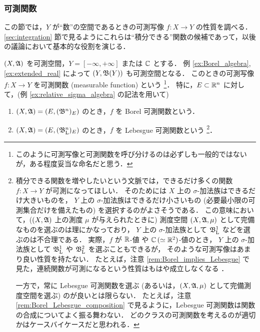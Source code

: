 \subsubsection{可測関数}

この節では，$Y$ が``数''の空間であるときの可測写像 $f:X\to Y$ の性質を調べる．
\ref{sec:integration} 節で見るようにこれらは``積分できる''関数の候補であって，以後の議論において基本的な役割を演じる．

\begin{definition}\label{def:measurable_function}
    $(X,\mathfrak{A})$ を可測空間，$Y=[-\infty,+\infty]$ または $\mathbb{C}$ とする．
    例 \ref{ex:Borel_algebra}, \ref{ex:extended_real} によって $(Y,\mathfrak{B}(Y))$ も可測空間となる．
    このときの可測写像 $f:X\to Y$ を可測関数 (measurable function) という
    \footnote{このように可測写像と可測関数を呼び分けるのは必ずしも一般的ではないが，ある程度妥当な命名だと思う\cite{ms95741}．}．
    特に，$E\subset\mathbb{R}^n$ に対して，(例 \ref{ex:relative_sigma_algebra} の記法を用いて)
    \begin{enumerate}
        \item $(X,\mathfrak{A})=(E,(\mathfrak{B}^n)_E)$ のとき，$f$ を Borel 可測関数という．
        \item $(X,\mathfrak{A})=(E,(\mathfrak{B}_{\mathrm{L}}^n)_E)$ のとき，$f$ を Lebesgue 可測関数という
            \footnote{
                積分できる関数を増やしたいという文脈では，できるだけ多くの関数 $f:X\to Y$ が可測になってほしい．
                そのためには $X$ 上の $\sigma$-加法族はできるだけ大きいものを，
                $Y$ 上の $\sigma$-加法族はできるだけ小さいもの (必要最小限の可測集合だけを備えたもの) を選択するのがよさそうである．
                この意味において，($(X,\mathfrak{A})$ 上の測度 $\mu$ が与えられたときに) 測度空間 $(X,\mathfrak{A},\mu)$ として完備なものを選ぶのは理にかなっており，
                $Y$ 上の $\sigma$-加法族として $\mathfrak{B}_{\mathrm{L}}^1$ などを選ぶのは不合理である．
                実際，$f$ が $\mathbb{R}$-値 や $\mathbb{C}\,(\simeq\mathbb{R}^2)$-値のとき，
                $Y$ 上の $\sigma$-加法族として $\mathfrak{B}_{\mathrm{L}}^1$ や $\mathfrak{B}_{\mathrm{L}}^2$ を選ぶこともできるが，
                そのような可測写像はあまり良い性質を持たない．
                たとえば，注意 \ref{rem:Borel_implies_Lebesgue} で見た，連続関数が可測になるという性質はもはや成立しなくなる \cite{mo31603}．

                一方で，常に Lebesgue 可測関数を選ぶ (あるいは，$(X,\mathfrak{A},\mu)$ として完備測度空間を選ぶ) のが良いとは限らない．
                たとえば，注意 \ref{rem:Borel_Lebesgue_composition} で見るように，Lebesgue 可測関数は関数の合成についてよく振る舞わない．
                どのクラスの可測関数を考えるのが適切かはケースバイケースだと思われる．
            }．
    \end{enumerate}
\end{definition}

